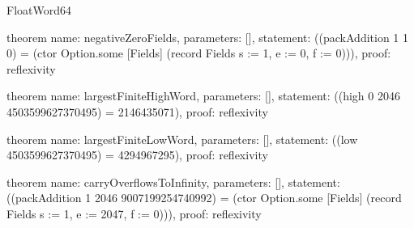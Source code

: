 \begin{lexlean}{FloatWord64}
\begin{semanticmodule}
theorem{
  name: negativeZeroFields,
  parameters: [],
  statement: ((packAddition 1 1 0) = (ctor Option.some [Fields] (record Fields {s := 1, e := 0, f := 0}))),
  proof: reflexivity{}
}

theorem{
  name: largestFiniteHighWord,
  parameters: [],
  statement: ((high 0 2046 4503599627370495) = 2146435071),
  proof: reflexivity{}
}

theorem{
  name: largestFiniteLowWord,
  parameters: [],
  statement: ((low 4503599627370495) = 4294967295),
  proof: reflexivity{}
}

theorem{
  name: carryOverflowsToInfinity,
  parameters: [],
  statement: ((packAddition 1 2046 9007199254740992) = (ctor Option.some [Fields] (record Fields {s := 1, e := 2047, f := 0}))),
  proof: reflexivity{}
}
\end{semanticmodule}
\end{lexlean}
